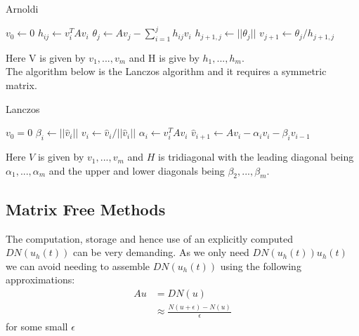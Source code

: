 \begin{algorithm}[H]
\caption{Arnoldi \cite{Fan2018}} %
\begin{algorithmic}
\State $v_0 \gets 0$
\State$h_{ij} \gets v_i^T A v_i$
\EndFor
\State$\theta_j \gets Av_j - \sum^j_{i=1} h_{ij}v_i$
\State$h_{j+1,j} \gets ||\theta_j||$
\State$v_{j+1} \gets \theta_j/h_{j+1,j}$
\EndFor
\EndProcedure
\end{algorithmic}
\end{algorithm}
Here V is given by $v_1,...,v_m$ and H is give by $h_1,...,h_m$.\\
The algorithm below is the Lanczos algorithm and it requires a symmetric matrix. \cite{Moler2003}
\begin{algorithm}[H]
\caption{Lanczos \cite{OJALVO1970}}
\begin{algorithmic}
\State $v_0 = 0$
\State$\beta_i \gets || \hat v_i ||$
\State$v_i \gets \hat v_i / || \hat v_i ||$
\State$\alpha_i \gets v_i^T A v_i$
\State$\hat v_{i+1} \gets Av_i - \alpha_iv_i - \beta_iv_{i-1}$
\EndFor
\EndProcedure
\end{algorithmic}
\end{algorithm}
Here $V$ is given by ${v_1,...,v_m}$ and $H$ is tridiagonal with the leading diagonal being $\alpha_1, ..., \alpha_m$ and the upper and lower diagonals being $\beta_2,...,\beta_m$.

\subsection{Matrix Free Methods}
The computation, storage and hence use of an explicitly computed $DN(u_h(t))$ can be very demanding.
As we only need $DN(u_h(t))u_h(t)$ we can avoid needing to assemble $DN(u_h(t))$ using the following approximations:
\begin{align*}
    Au &= DN(u)\\
    &\approx \frac{N(u+\epsilon)-N(u)}{\epsilon}
\end{align*}
for some small $\epsilon$